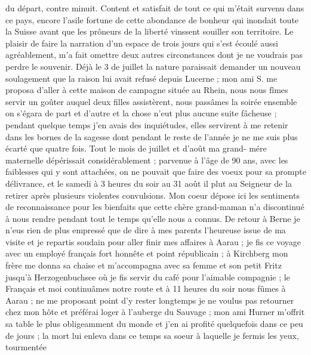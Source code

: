 \documentclass[12pt]{article}
\begin{document}
 du départ, contre minuit. Content et
satisfait de tout ce qui m’était survenu dans ce pays, encore l’asile fortune de cette abondance de
bonheur qui inondait toute la Suisse avant que les prôneurs de la liberté vinssent souiller son
territoire. Le plaisir de faire la narration d’un espace de trois jours qui s’est écoulé aussi
agréablement, m’a fait omettre deux autres circonstances dont je ne voudrais pas perdre le souvenir.
Déjà le 3 de juillet la nature paraissait demander un nouveau soulagement que la raison lui avait
refusé depuis Lucerne ; mon ami S. me proposa d’aller à cette maison de campagne située au Rhein,
nous nous fîmes servir un goûter auquel deux filles assistèrent, nous passâmes la soirée ensemble on
s’égara de part et d’autre et la chose n’eut plus aucune suite fâcheuse ; pendant quelque temps j’en
avais des inquiétudes, elles servirent à me retenir dans les bornes de la sagesse dont pendant le
reste de l’année je ne me suis plus écarté que quatre fois. Tout le mois de juillet et d’août ma
grand- mére maternelle dépérissait considérablement ; parvenue à l’âge de 90 ans, avec les
faiblesses qui y sont attachées, on ne pouvait que faire des voeux pour sa prompte délivrance, et le
samedi à 3 heures du soir au 31 août il plut au Seigneur de la retirer après plusieurs violentes
convulsions. Mon coeur dépose ici les sentiments de reconnaissance pour les bienfaits que cette
chère grand-maman n’a discontinué à nous rendre pendant tout le temps qu’elle nous a connus. De
retour à Berne je n’eus rien de plus empressé que de dire à mes parents l’heureuse issue de ma
visite et je repartis soudain pour aller finir mes affaires à Aarau ; je fis ce voyage avec un
employé français fort honnête et point républicain ; à Kirchberg mon frère me donna sa chaise et
m’accompagna avec sa femme et son petit Fritz jusqu’à Herzogenbuchsee où je fis servir du café pour
l’aimable compagnie ; le Français et moi continuâmes notre route et à 11 heures du soir nous fûmes à
Aarau ; ne me proposant point d’y rester longtemps je ne voulus pas retourner chez mon hôte et
préférai loger à l’auberge du Sauvage ; mon ami Hurner m’offrit sa table le plus obligeamment du
monde et j’en ai profité quelquefois dans ce peu de jours ; la mort lui enleva dans ce temps sa
soeur à laquelle je fermis les yeux, tourmentée
\end{document}
